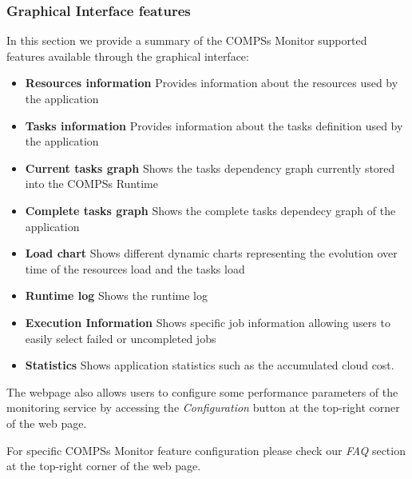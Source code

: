 \newpage
\subsubsection{Graphical Interface features}
In this section we provide a summary of the COMPSs Monitor supported features available through the graphical interface:
\begin{itemize}
 \item \textbf{Resources information} \newline
	Provides information about the resources used by the application
 \item \textbf{Tasks information} \newline
	Provides information about the tasks definition used by the application
 \item \textbf{Current tasks graph} \newline
	Shows the tasks dependency graph currently stored into the COMPSs Runtime
 \item \textbf{Complete tasks graph} \newline
	Shows the complete tasks dependecy graph of the application
 \item \textbf{Load chart} \newline
	Shows different dynamic charts representing the evolution over time of the resources load and the tasks load
 \item \textbf{Runtime log} \newline
	Shows the runtime log
 \item \textbf{Execution Information} \newline
	Shows specific job information allowing users to easily select failed or uncompleted jobs
 \item \textbf{Statistics} \newline
	Shows application statistics such as the accumulated cloud cost. 
\end{itemize}


The webpage also allows users to configure some performance parameters of the monitoring service by accessing the 
\textit{Configuration} button at the top-right corner of the web page. 

For specific COMPSs Monitor feature configuration please check our \textit{FAQ} section at the top-right corner of the web page. 


